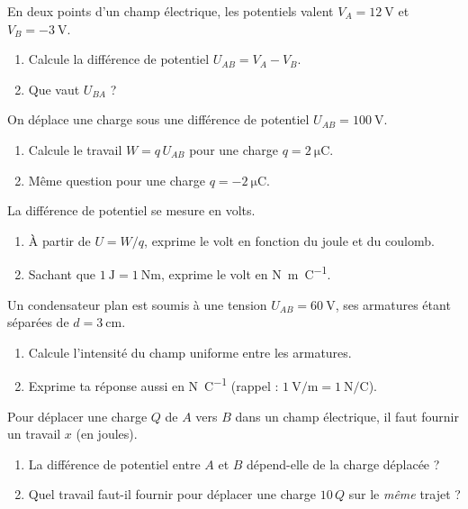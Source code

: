 \documentclass[11pt,a4paper]{article}
\begin{document}

\begin{exo}
En deux points d'un champ électrique, les potentiels valent $V_A = \SI{12}{\volt}$ et
$V_B = \SI{-3}{\volt}$.
\begin{enumerate}[label=\alph*)]
  \item Calcule la différence de potentiel $U_{AB} = V_A - V_B$.
  \item Que vaut $U_{BA}$ ?
\end{enumerate}
\end{exo}

\begin{exo}
On déplace une charge sous une différence de potentiel $U_{AB} = \SI{100}{\volt}$.
\begin{enumerate}[label=\alph*)]
  \item Calcule le travail $W = q\,U_{AB}$ pour une charge $q = \SI{+2}{\micro\coulomb}$.
  \item Même question pour une charge $q = \SI{-2}{\micro\coulomb}$.
\end{enumerate}
\end{exo}

\begin{exo}
La différence de potentiel se mesure en volts.
\begin{enumerate}[label=\alph*)]
  \item À partir de $U = W/q$, exprime le volt en fonction du joule et du coulomb.
  \item Sachant que $\SI{1}{\joule} = \SI{1}{\newton\metre}$, exprime le volt en \si{\newton\metre\per\coulomb}.
\end{enumerate}
\end{exo}

\begin{exo}
Un condensateur plan est soumis à une tension $U_{AB} = \SI{60}{\volt}$, ses armatures étant
séparées de $d = \SI{3}{\centi\metre}$.
\begin{enumerate}[label=\alph*)]
  \item Calcule l'intensité du champ uniforme entre les armatures.
  \item Exprime ta réponse aussi en \si{\newton\per\coulomb} (rappel : $\SI{1}{\volt\per\metre} = \SI{1}{\newton\per\coulomb}$).
\end{enumerate}
\end{exo}

\begin{exo}
Pour déplacer une charge $Q$ de $A$ vers $B$ dans un champ électrique, il faut fournir un travail
$x$ (en joules).
\begin{enumerate}[label=\alph*)]
  \item La différence de potentiel entre $A$ et $B$ dépend-elle de la charge déplacée ?
  \item Quel travail faut-il fournir pour déplacer une charge $10\,Q$ sur le \emph{même} trajet ?
\end{enumerate}
\end{exo}
\end{document}
